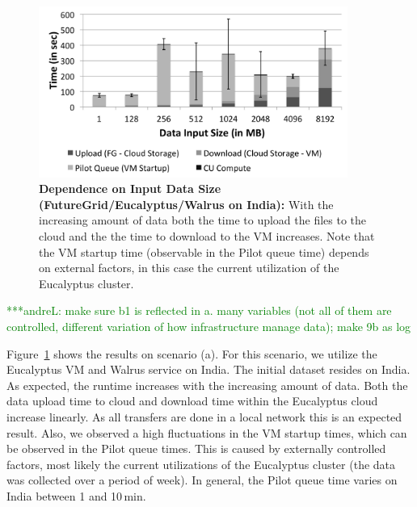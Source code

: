 \documentclass[times]{cpeauth}
\newcommand{\alnote}[1]{ {\textcolor{green} { ***andreL: #1 }}}
\newcommand{\alnote}[1]{}
\newcommand{\pilot}{Pilot\xspace}
\begin{document}
\begin{figure}[t]
	\centering
		\includegraphics[width=0.9\textwidth]{performance/pd_fg_input_size.pdf}
	\caption{\textbf{Dependence on Input Data Size 
	(FutureGrid/Eucalyptus/Walrus on India):} With the increasing amount of 
	data both the time to upload the files to the cloud and the the time to 
	download to the VM increases. Note that the VM startup time (observable in 
	the \pilot queue time) depends on external factors, in this case the 
	current utilization of the Eucalyptus cluster.}
	\label{fig:performance_size}
\end{figure}

\alnote{make sure b1 is reflected in a. many variables (not all of them are 
controlled, different variation of how infrastructure manage data); make 9b as 
log}

Figure~\ref{fig:performance_size} shows the results on scenario (a). For this
scenario, we utilize the Eucalyptus VM and Walrus service on India. The 
initial dataset resides on India. As expected, the runtime increases with the 
increasing amount of data. Both the data upload time to cloud and download 
time within the Eucalyptus cloud increase linearly. As all transfers are done 
in a local network this is an expected result. Also, we observed a high 
fluctuations in the VM startup times, which can be observed in the \pilot 
queue times. This is caused by externally controlled factors, most likely
the current utilizations of the Eucalyptus cluster (the data was 
collected over a period of week). In general, the \pilot queue time varies on 
India between 1 and 10\,min.
\end{document}
